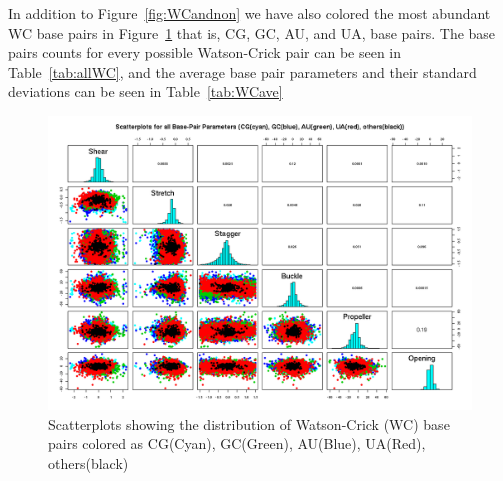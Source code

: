 In addition to Figure~\ref{fig:WCandnon} we have also colored the most
abundant WC base pairs  in Figure~\ref{fig:mainWC} that is, CG, GC, AU, and UA, base
pairs. The base pairs counts for every possible Watson-Crick pair can
be seen in Table~\ref{tab:allWC}, and the average base pair parameters
and their standard deviations can be seen in Table~\ref{tab:WCave}

\begin{figure}[H]
\centering
\includegraphics[scale=0.6, angle=90]{CGGCAUUA.png}
\caption{Scatterplots showing the distribution of Watson-Crick (WC)
  base pairs colored as CG(Cyan), GC(Green), AU(Blue), UA(Red), others(black)}
\label{fig:mainWC}
\end{figure}


